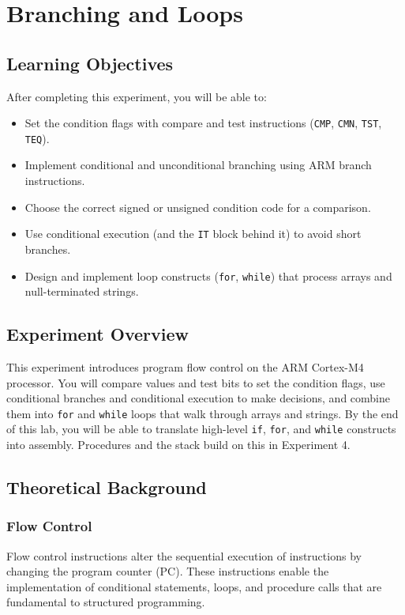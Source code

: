 \chapter{Branching and Loops}

\section*{Learning Objectives}
After completing this experiment, you will be able to:
\begin{itemize}[nosep]
  \item Set the condition flags with compare and test instructions (\texttt{CMP}, \texttt{CMN}, \texttt{TST}, \texttt{TEQ}).
  \item Implement conditional and unconditional branching using ARM branch instructions.
  \item Choose the correct signed or unsigned condition code for a comparison.
  \item Use conditional execution (and the \texttt{IT} block behind it) to avoid short branches.
  \item Design and implement loop constructs (\texttt{for}, \texttt{while}) that process arrays and null-terminated strings.
\end{itemize}

\section*{Experiment Overview}
This experiment introduces program flow control on the ARM Cortex-M4 processor. You will compare values and test bits to set the condition flags, use conditional branches and conditional execution to make decisions, and combine them into \texttt{for} and \texttt{while} loops that walk through arrays and strings. By the end of this lab, you will be able to translate high-level \texttt{if}, \texttt{for}, and \texttt{while} constructs into assembly. Procedures and the stack build on this in Experiment 4.

\newpage

\section{Theoretical Background}
\subsection{Flow Control}
Flow control instructions alter the sequential execution of instructions by changing the program counter (PC). These instructions enable the implementation of conditional statements, loops, and procedure calls that are fundamental to structured programming.

